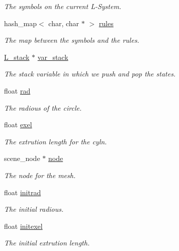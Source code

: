\begin{DoxyCompactItemize}
\begin{DoxyCompactList}\small\item\em The symbols on the current L-\/\+System. \end{DoxyCompactList}\item 
hash\+\_\+map$<$ char, char $\ast$ $>$ \hyperlink{classoctet_1_1_maths___l___systems_a5c57f1806d42933de86a1d2b2693eb26}{rules}
\begin{DoxyCompactList}\small\item\em The map between the symbols and the rules. \end{DoxyCompactList}\item 
\hyperlink{classoctet_1_1_l__stack}{L\+\_\+stack} $\ast$ \hyperlink{classoctet_1_1_maths___l___systems_a565e71fcec0d1a4d0cca48e99c3b6aca}{var\+\_\+stack}
\begin{DoxyCompactList}\small\item\em The stack variable in which we push and pop the states. \end{DoxyCompactList}\item 
float \hyperlink{classoctet_1_1_maths___l___systems_a3ffafcbe960edcaf6255cc3be7fc10af}{rad}
\begin{DoxyCompactList}\small\item\em The radious of the circle. \end{DoxyCompactList}\item 
float \hyperlink{classoctet_1_1_maths___l___systems_a44da9fdd3c673cac831cf894aa02ec46}{exel}
\begin{DoxyCompactList}\small\item\em The extrution length for the cyln. \end{DoxyCompactList}\item 
scene\+\_\+node $\ast$ \hyperlink{classoctet_1_1_maths___l___systems_ab7bffab6b7ca8de169cccc0dc999a130}{node}
\begin{DoxyCompactList}\small\item\em The node for the mesh. \end{DoxyCompactList}\item 
float \hyperlink{classoctet_1_1_maths___l___systems_acd18538c7b279c111b52f3286be824b3}{initrad}
\begin{DoxyCompactList}\small\item\em The initial radious. \end{DoxyCompactList}\item 
float \hyperlink{classoctet_1_1_maths___l___systems_a0c7beee6e733f6f1912807f2f2912fe8}{initexel}
\begin{DoxyCompactList}\small\item\em The initial extrution length. \end{DoxyCompactList}\item 

\end{DoxyCompactItemize}
